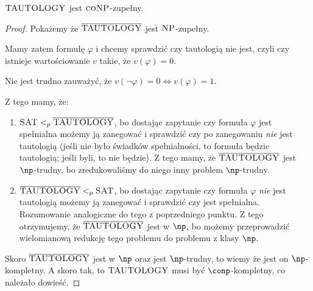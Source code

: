 \begin{theorem}
    \( \textsc{TAUTOLOGY} \) jest \( \textsc{coNP} \)-zupełny.
\end{theorem}
\begin{proof}
    Pokażemy że \( \overline{\textsc{TAUTOLOGY}} \) jest \( \textsc{NP} \)-zupełny.
    
    Mamy zatem formułę \( \varphi \) i chcemy sprawdzić czy tautologią nie jest, czyli czy istnieje wartościowanie \( v \) takie, że \( v(\varphi) = 0 \). 
    
    Nie jest trudno zauważyć, że \( v(\lnot \varphi) = 0 \iff v(\varphi) = 1 \).
    
    Z tego mamy, że:
    
    \begin{enumerate}
        \item \( \textsc{SAT} <_p \overline{\textsc{TAUTOLOGY}}\), bo dostając zapytanie czy formuła \( \varphi \) jest spełnialna możemy ją zanegować i sprawdzić czy po zanegowaniu \textit{nie} jest tautologią (jeśli nie było świadków spełnialności, to formuła będzie tautologią; jeśli byli, to nie będzie). Z tego mamy, że \(\overline{\textsc{TAUTOLOGY}}\) jest \(\np\)-trudny, bo zredukowaliśmy do niego inny problem \(\np\)-trudny.
        \item \(\overline{\textsc{TAUTOLOGY}} <_p \textsc{SAT} \), bo dostając zapytanie czy formuła \( \varphi \) \textit{nie} jest tautologią możemy ją zanegować i sprawdzić czy jest spełnialna. Rozumowanie analogiczne do tego z poprzedniego punktu. Z tego otrzymujemy, że \(\overline{\textsc{TAUTOLOGY}}\) jest w \(\np\), bo możemy przeprowadzić wielomianową redukcję tego problemu do problemu z klasy \(\np\). 
    \end{enumerate}
    
    Skoro \(\overline{\textsc{TAUTOLOGY}}\) jest w \(\np\) oraz jest \(\np\)-trudny, to wiemy że jest on \(\np\)-kompletny. A skoro tak, to \(\textsc{TAUTOLOGY}\) musi być \(\conp\)-kompletny, co należało dowieść. 
\end{proof}